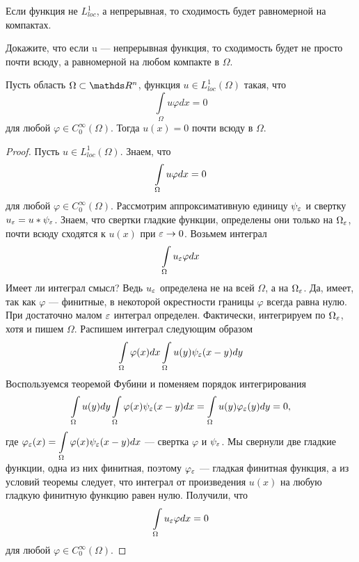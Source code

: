 Если функция не $L_{loc}^1$, а непрерывная, то сходимость будет равномерной на компактах.
\begin{exercise}
Докажите, что если u --- непрерывная функция, то сходимость будет не просто почти всюду, а равномерной на любом компакте в $\Omega$.
\end{exercise}

\begin{lemma}
Пусть область $\Omega \subset \real^n$, функция $u \in L_{loc}^1(\Omega)$ такая, что 
$$\int \limits_{\Omega} u \varphi dx = 0$$ 
для любой $\varphi \in C_0^\infty(\Omega)$. Тогда $u(x) = 0$ почти всюду в $\Omega$.
\end{lemma}

\begin{proof}
Пусть $u \in L_{loc}^1(\Omega)$. Знаем, что
$$\int \limits_{\Omega} u \varphi dx = 0$$
для любой $\varphi \in C_0^{\infty}(\Omega)$.
Рассмотрим аппроксимативную единицу $\psi_{\varepsilon}$ и свертку $u_{\varepsilon} = u * \psi_{\varepsilon}$. 
Знаем, что свертки гладкие функции, определены они только на $\Omega_{\varepsilon}$, почти всюду сходятся к $u(x)$ при $\varepsilon \rightarrow 0$. 
Возьмем интеграл 
$$\int \limits_{\Omega} u_{\varepsilon} \varphi dx$$
Имеет ли интеграл смысл? Ведь $u_{\varepsilon}$ определена не на всей $\Omega$, а на $\Omega_{\varepsilon}$. Да, имеет, так как $\varphi$ --- финитные, в некоторой окрестности границы $\varphi$ всегда равна нулю. При достаточно малом $\varepsilon$ интеграл определен. Фактически, интегрируем по $\Omega_{\varepsilon}$, хотя и пишем $\Omega$. 
Распишем интеграл следующим образом
$$ \int \limits_{\Omega} \varphi(x) dx \int \limits_{\Omega} u(y) \psi_{\varepsilon}(x - y) dy$$
Воспользуемся теоремой Фубини и поменяем порядок интегрирования
$$ \int \limits_{\Omega} u(y) dy \int \limits_{\Omega} \varphi(x) \psi_{\varepsilon}(x - y) dx = \int \limits_{\Omega} u(y) \varphi_{\varepsilon}(y) dy = 0,$$
где $\varphi_{\varepsilon}(x) = \displaystyle \int \limits_{\Omega} \varphi(x) \psi_{\varepsilon}(x - y) dx$ --- свертка $\varphi$ и $\psi_{\varepsilon}$. 
Мы свернули две гладкие функции, одна из них финитная, поэтому $\varphi_{\varepsilon}$ --- гладкая финитная функция, а из условий теоремы следует, что интеграл от произведения $u(x)$ на любую гладкую финитную функцию равен нулю.
Получили, что 
$$\int \limits_{\Omega} u_{\varepsilon} \varphi dx = 0$$
для любой $\varphi \in C_0^{\infty}(\Omega)$.


\end{proof}
